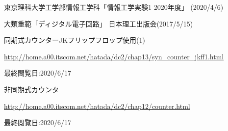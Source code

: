 \documentclass[12pt]{jarticle}
\begin{document}
\begin{thebibliography}{99}
    \label{sannkoubunnkenn_chapter}
    東京理科大学工学部情報工学科「情報工学実験1 2020年度」
    (2020/4/6)

    大類重範「ディジタル電子回路」
    日本理工出版会(2017/5/15)

    同期式カウンターJKフリップフロップ使用(1)

    \url{http://home.a00.itscom.net/hatada/dc2/chap13/syn_counter_jkff1.html}

    最終閲覧日:2020/6/17

    非同期式カウンタ

    \url{http://home.a00.itscom.net/hatada/dc2/chap12/counter.html}

    最終閲覧日:2020/6/17
\end{thebibliography}

\clearpage
\appendix
\end{document}
